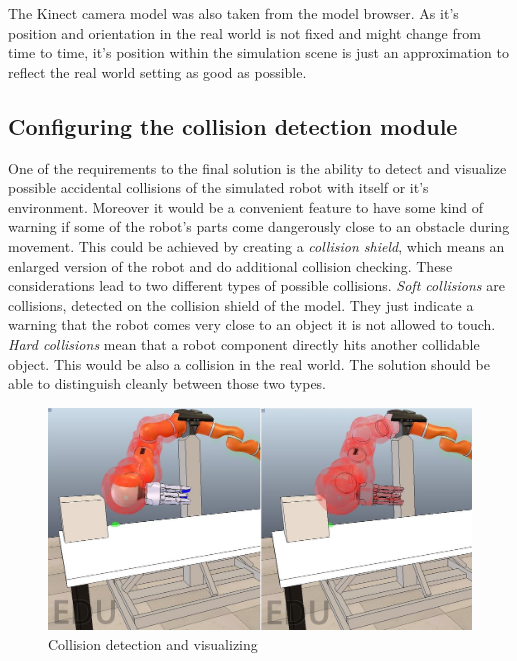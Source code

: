 The Kinect camera model was also taken from the model browser. As it's position and orientation in the real world is not fixed and might change from time to time, it's position within the simulation scene is just an approximation to reflect the real world setting as good as possible. 

\subsection{Configuring the collision detection module}
\label{sec:config_col}

One of the requirements to the final solution is the ability to detect and visualize possible accidental collisions of the simulated robot with itself or it's environment. Moreover it would be a convenient feature to have some kind of warning if some of the robot's parts come dangerously close to an obstacle during movement. This could be achieved by creating a \emph{collision shield}, which means an enlarged version of the robot and do additional collision checking. These considerations lead to two different types of possible collisions. \emph{Soft collisions} are collisions, detected on the collision shield of the model. They just indicate a warning that the robot comes very close to an object it is not allowed to touch. \emph{Hard collisions} mean that a robot component directly hits another collidable object. This would be also a collision in the real world. The solution should be able to distinguish cleanly between those two types.\\ 

\begin{figure}[hb]
	\centering
  	\includegraphics[width=1.0\textwidth]{images/collision.jpg}
	\caption{Collision detection and visualizing}
	\label{fig:collision}
\end{figure}

